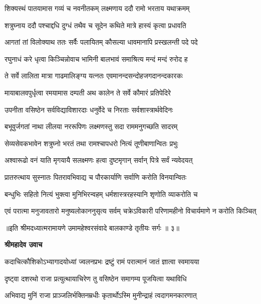 \twolineshloka
{शिक्यस्थं पातयामास गव्यं च नवनीतकम्}
{लक्ष्मणाय ददौ रामो भरताय यथाक्रमम्} %

\twolineshloka
{शत्रुघ्नाय ददौ पश्चाद्दधि दुग्धं तथैव च}
{सूदेन कथिते मात्रे हास्यं कृत्वा प्रधावति} %

\twolineshloka
{आगतां तां विलोक्याथ ततः सर्वैः पलायितम्}
{कौसल्या धावमानापि प्रस्खलन्ती पदे पदे} %

\twolineshloka
{रघुनाधं करे धृत्वा किञ्चिन्नोवाच भामिनी}
{बालभावं समाश्रित्य मन्दं मन्दं रुरोद ह} %

\twolineshloka
{ते सर्वे लालिता मात्रा गाढमालिङ्ग्य यत्नतः}
{एवमानन्दसन्दोहजगदानन्दकारकः} %

\twolineshloka
{मायाबालवपुर्धृत्वा रमयामास दम्पती}
{अथ कालेन ते सर्वे कौमारं प्रतिपेदिरे} %

\twolineshloka
{उपनीता वसिष्ठेन सर्वविद्याविशारदाः}
{धनुर्वेदे च निरताः सर्वशास्त्रार्थवेदिनः} %

\twolineshloka
{बभूवुर्जगतां नाथा लीलया नररूपिणः}
{लक्ष्मणस्तु सदा राममनुगच्छति सादरम्} %

\twolineshloka
{सेव्यसेवकभावेन शत्रुघ्नो भरतं तथा}
{रामश्चापधरो नित्यं तूणीबाणान्वितः प्रभुः} %

\twolineshloka
{अश्वारूढो वनं याति मृगयायै सलक्ष्मणः}
{हत्वा दुष्टमृगान् सर्वान् पित्रे सर्वं न्यवेदयत्} %

\twolineshloka
{प्रातरुत्थाय सुस्नातः पितरावभिवाद्य च}
{पौरकार्याणि सर्वाणि करोति विनयान्वितः} %

\twolineshloka
{बन्धुभिः सहितो नित्यं भुक्त्वा मुनिभिरन्वहम्}
{धर्मशास्त्ररहस्यानि शृणोति व्याकरोति च} %

\twolineshloka
{एवं परात्मा मनुजावतारो मनुष्यलोकाननुसृत्य सर्वम्}
{चक्रेऽविकारी परिणामहीनो विचार्यमाणे न करोति किञ्चित्} %

{॥इति श्रीमदध्यात्मरामायणे उमामहेश्वरसंवादे
बालकाण्डे तृतीयः सर्गः ॥ ३॥
}




\textbf{श्रीमहादेव उवाच}

\twolineshloka
{कदाचित्कौशिकोऽभ्यागादयोध्यां ज्वलनप्रभः}
{द्रष्टुं रामं परात्मानं जातं ज्ञात्वा स्वमायया} %

\twolineshloka
{दृष्ट्वा दशरथो राजा प्रत्युत्थायाचिरेण तु}
{वसिष्ठेन समागम्य पूजयित्वा यथाविधि} %

\twolineshloka
{अभिवाद्य मुनिं राजा प्राञ्जलिर्भक्तिनम्रधीः}
{कृतार्थोऽस्मि मुनीन्द्राहं त्वदागमनकारणात्} %

